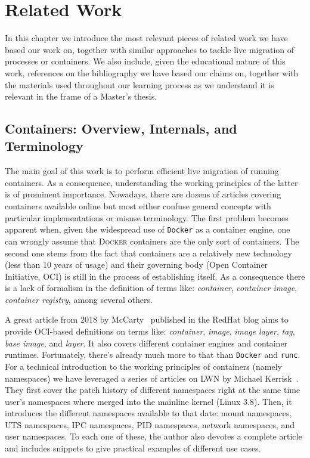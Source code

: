\chapter{Related Work} \label{chap:related-work}

In this chapter we introduce the most relevant pieces of related work we have based our work on, together with similar approaches to tackle live migration of processes or containers.
We also include, given the educational nature of this work, references on the bibliography we have based our claims on, together with the materials used throughout our learning process as we understand it is relevant in the frame of a Master's thesis.

\section{Containers: Overview, Internals, and Terminology} \label{sec:rw-cont}

The main goal of this work is to perform efficient live migration of running containers.
As a consequence, understanding the working principles of the latter is of prominent importance.
Nowadays, there are dozens of articles covering containers available online but most either confuse general concepts with particular implementations or misuse terminology.
The first problem becomes apparent when, given the widespread use of \texttt{Docker} as a container engine, one can wrongly assume that \textsc{Docker} containers are the only sort of containers.
The second one stems from the fact that containers are a relatively new technology (less than 10 years of usage) and their governing body (Open Container Initiative, OCI) is still in the process of establishing itself.
As a consequence there is a lack of formalism in the definition of terms like: \textit{container}, \textit{container image}, \textit{container registry}, among several others.

A great article from 2018 by McCarty~\cite{McCarty2018} published in the RedHat blog aims to provide OCI-based definitions on terms like: \textit{container}, \textit{image}, \textit{image layer}, \textit{tag}, \textit{base image}, and \textit{layer}.
It also covers different container engines and container runtimes.
Fortunately, there's already much more to that than \texttt{Docker} and \texttt{runc}.
For a technical introduction to the working principles of containers (namely namespaces) we have leveraged a series of articles on LWN by Michael Kerrisk~\cite{Kerrisk2013}.
They first cover the patch history of different namespaces right at the same time user's namespaces where merged into the mainline kernel (Linux 3.8).
Then, it introduces the different namespaces available to that date: mount namespaces, UTS namespaces, IPC namespaces, PID namespaces, network namespaces, and user namespaces.
To each one of these, the author also devotes a complete article and includes snippets to give practical examples of different use cases.

